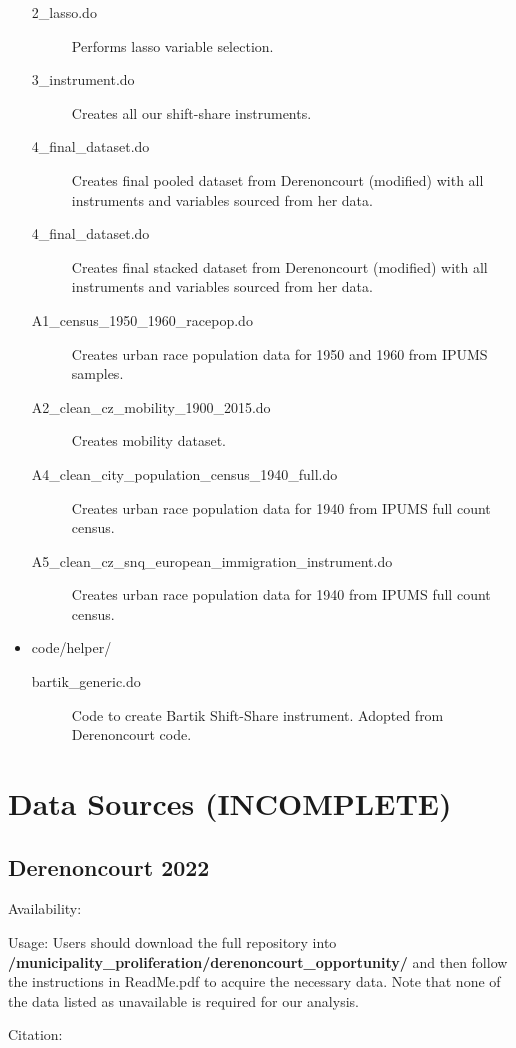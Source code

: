 \documentclass{article}
\begin{document}
\begin{itemize}
		\begin{description}
		\item[2\_lasso.do] Performs lasso variable selection.
		\item[3\_instrument.do] Creates all our shift-share instruments.
		\item[4\_final\_dataset.do] Creates final pooled dataset from Derenoncourt (modified) with all instruments and variables sourced from her data.
		\item[4\_final\_dataset.do] Creates final stacked dataset from Derenoncourt (modified) with all instruments and variables sourced from her data.
		\item[A1\_census\_1950\_1960\_racepop.do] Creates urban race population data for 1950 and 1960 from IPUMS samples.
		\item[A2\_clean\_cz\_mobility\_1900\_2015.do] Creates mobility dataset.
		\item[A4\_clean\_city\_population\_census\_1940\_full.do] Creates urban race population data for 1940 from IPUMS full count census.
		\item[A5\_clean\_cz\_snq\_european\_immigration\_instrument.do] Creates urban race population data for 1940 from IPUMS full count census.
		\end{description}
	\item code/helper/
	
		\begin{description}
		\item[bartik\_generic.do] Code to create Bartik Shift-Share instrument. Adopted from Derenoncourt code.
		\end{description}
\end{itemize}




\section{Data Sources (INCOMPLETE)}
\subsection{Derenoncourt 2022}
Availability:

Usage: Users should download the full repository into \textbf{/municipality\_proliferation/derenoncourt\_opportunity/} and then follow the instructions in ReadMe.pdf to acquire the necessary data. Note that none of the data listed as unavailable is required for our analysis.

Citation: 
\end{document}

